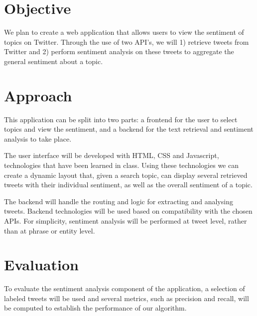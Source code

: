 \section{Objective}
We plan to create a web application that allows users to view the sentiment of topics on Twitter. Through the use of two API’s, we will 1) retrieve tweets from Twitter and 2) perform sentiment analysis on these tweets to aggregate the general sentiment about a topic. 

\section{Approach}
This application can be split into two parts: a frontend for the user to select topics and view the sentiment, and a backend for the text retrieval and sentiment analysis to take place. 

The user interface will be developed with HTML, CSS and Javascript, technologies that have been learned in class. Using these technologies we can create a dynamic layout that, given a search topic, can display several retrieved tweets with their individual sentiment, as well as the overall sentiment of a topic.

The backend will handle the routing and logic for extracting and analysing tweets. Backend technologies will be used based on compatibility with the chosen APIs. For simplicity, sentiment analysis will be performed at tweet level, rather than at phrase or entity level. 

\section{Evaluation}
To evaluate the sentiment analysis component of the application, a selection of labeled tweets will be used and several metrics, such as precision and recall, will be computed to establish the performance of our algorithm.  

